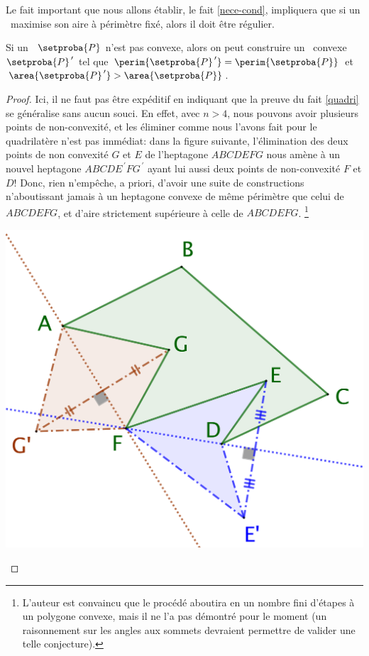 Le fait important que nous allons établir, le fait \ref{nece-cond}, impliquera que si un \ngone\ maximise son aire à périmètre fixé, alors il doit être régulier.




\begin{fact} \label{conv-poly}
	Si un \ngone\ $\setproba{P}$ n'est pas convexe, alors on peut construire un \ngone\ convexe $\setproba{P}^{\,\prime}$ tel que 
	$\perim{\setproba{P}^{\,\prime}} = \perim{\setproba{P}}$ 
	et 
	$\area{\setproba{P}^{\,\prime}} > \area{\setproba{P}}$.
\end{fact}


\begin{proof}
	Ici, il ne faut pas être expéditif en indiquant que la preuve du fait \ref{quadri} se généralise sans aucun souci.
	En effet, avec $n > 4$, nous pouvons avoir plusieurs points de non-convexité, et les éliminer comme nous l'avons fait pour le quadrilatère n'est pas immédiat:
	dans la figure suivante, l'élimination des deux points de non convexité $G$ et $E$ de l'heptagone $ABCDEFG$ nous amène à un nouvel heptagone $ABCDE^{\,\prime}FG^{\,\prime}$ ayant lui aussi deux points de non-convexité $F$ et $D$!
	Donc, rien n'empêche, a priori, d'avoir une suite de constructions n'aboutissant jamais à un heptagone convexe
	de même périmètre que celui de $ABCDEFG$, et d'aire strictement supérieure à celle de $ABCDEFG$.%
	\footnote{
		L'auteur est convaincu que le procédé aboutira en un nombre fini d'étapes à un polygone convexe, mais il ne l'a pas démontré pour le moment (un raisonnement sur les angles aux sommets devraient permettre de valider une telle conjecture).
	}

	\begin{center}
		\includegraphics[scale=.4]{content/polygon/non-convex-trap.png}
	\end{center}
	


\end{proof}

